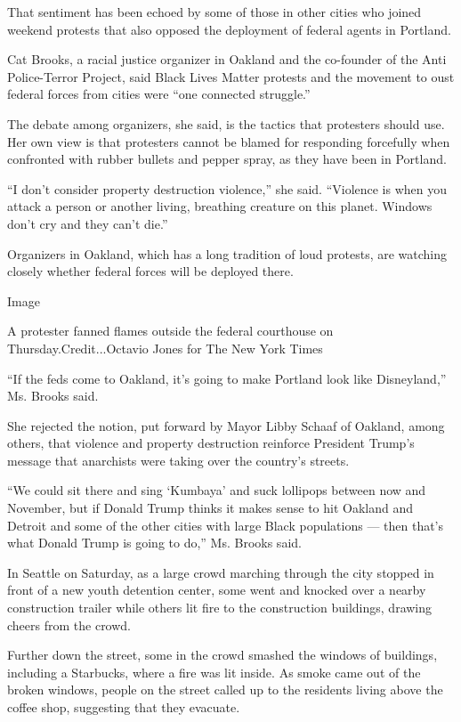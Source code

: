 That sentiment has been echoed by some of those in other cities who
joined weekend protests that also opposed the deployment of federal
agents in Portland.

Cat Brooks, a racial justice organizer in Oakland and the co-founder of
the Anti Police-Terror Project, said Black Lives Matter protests and the
movement to oust federal forces from cities were ``one connected
struggle.''

The debate among organizers, she said, is the tactics that protesters
should use. Her own view is that protesters cannot be blamed for
responding forcefully when confronted with rubber bullets and pepper
spray, as they have been in Portland.

``I don't consider property destruction violence,'' she said. ``Violence
is when you attack a person or another living, breathing creature on
this planet. Windows don't cry and they can't die.''

Organizers in Oakland, which has a long tradition of loud protests, are
watching closely whether federal forces will be deployed there.

Image

A protester fanned flames outside the federal courthouse on
Thursday.Credit...Octavio Jones for The New York Times

``If the feds come to Oakland, it's going to make Portland look like
Disneyland,'' Ms. Brooks said.

She rejected the notion, put forward by Mayor Libby Schaaf of Oakland,
among others, that violence and property destruction reinforce President
Trump's message that anarchists were taking over the country's streets.

``We could sit there and sing `Kumbaya' and suck lollipops between now
and November, but if Donald Trump thinks it makes sense to hit Oakland
and Detroit and some of the other cities with large Black populations
--- then that's what Donald Trump is going to do,'' Ms. Brooks said.

In Seattle on Saturday, as a large crowd marching through the city
stopped in front of a new youth detention center, some went and knocked
over a nearby construction trailer while others lit fire to the
construction buildings, drawing cheers from the crowd.

Further down the street, some in the crowd smashed the windows of
buildings, including a Starbucks, where a fire was lit inside. As smoke
came out of the broken windows, people on the street called up to the
residents living above the coffee shop, suggesting that they evacuate.

